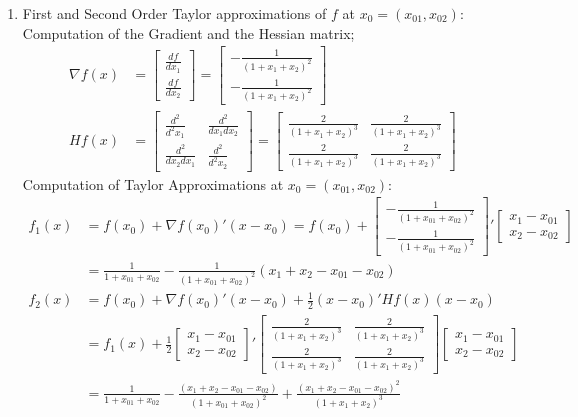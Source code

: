 \documentclass[12pt]{article}
\begin{document}
\begin{enumerate}
\begin{enumerate}
\item 
First and Second Order Taylor approximations of $f$ at $x_0=(x_{01},x_{02})$:\\
Computation of the Gradient and the Hessian matrix;
\begin{equation}
	\begin{split}
		\nabla f(x) &=\begin{bmatrix}
			\frac{df}{dx_1} \\ \frac{df}{dx_2}
		\end{bmatrix} =
		\begin{bmatrix}
			-\frac{1}{(1+x_1+x_2)^2} \\ -\frac{1}{(1+x_1+x_2)^2} 
		\end{bmatrix}\\
		Hf(x) &=\begin{bmatrix}
			\frac{d^2}{d^2 x_1} & \frac{d^2}{dx_1dx_2}\\
			\frac{d^2}{dx_2dx_1} & \frac{d^2}{d^2 x_2}
		\end{bmatrix}=\begin{bmatrix}
			\frac{2}{(1+x_1+x_2)^3} & \frac{2}{(1+x_1+x_2)^3}\\
			\frac{2}{(1+x_1+x_2)^3} & \frac{2}{(1+x_1+x_2)^3}
		\end{bmatrix}
	\end{split}
\end{equation}
Computation of Taylor Approximations at $x_0=(x_{01},x_{02})$:
\begin{equation}
	\begin{split}
		f_1(x)&=f(x_0)+\nabla f(x_0)'(x-x_0)=f(x_0)+\begin{bmatrix}
			-\frac{1}{(1+x_{01}+x_{02})^2} \\ -\frac{1}{(1+x_{01}+x_{02})^2} 
		\end{bmatrix}'\begin{bmatrix}
		x_{1}-x_{01} \\ x_{2}-x_{02}
	\end{bmatrix}\\
	&=\frac{1}{1+x_{01}+x_{02}} -\frac{1}{(1+x_{01}+x_{02})^2}(x_1+x_2-x_{01}-x_{02})\\	
	f_2(x)&=f(x_0)+\nabla f(x_0)'(x-x_0) + \frac{1}{2}(x-x_0)'Hf(x)(x-x_0)\\
	&=f_1(x)+\frac{1}{2}\begin{bmatrix}
		x_{1}-x_{01} \\ x_{2}-x_{02}
	\end{bmatrix}'\begin{bmatrix}
		\frac{2}{(1+x_1+x_2)^3} & \frac{2}{(1+x_1+x_2)^3}\\
		\frac{2}{(1+x_1+x_2)^3} & \frac{2}{(1+x_1+x_2)^3}
	\end{bmatrix}\begin{bmatrix}
	x_{1}-x_{01} \\ x_{2}-x_{02}
\end{bmatrix}\\
	&=\frac{1}{1+x_{01}+x_{02}} -\frac{(x_1+x_2-x_{01}-x_{02})}{(1+x_{01}+x_{02})^2}+\frac{(x_1+x_2-x_{01}-x_{02})^2}{(1+x_1+x_2)^3}
	\end{split}
\end{equation}


\end{enumerate}
\end{enumerate}
\end{document}
